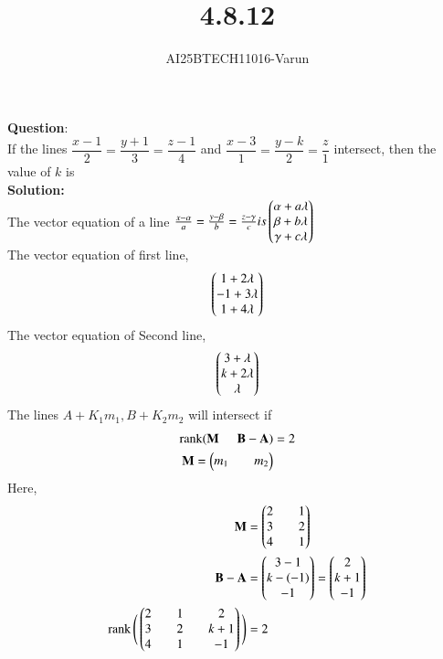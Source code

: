 \documentclass[journal]{IEEEtran}
\begin{document}

\vspace{3cm}

\title{4.8.12}
\author{AI25BTECH11016-Varun}
 \maketitle
{\let\newpage\relax\maketitle}
\renewcommand{\thefigure}{\theenumi}
\renewcommand{\thetable}{\theenumi}
\setlength{\intextsep}{10pt} %

\renewcommand{\thetable}{\theenumi}
\textbf{Question}:\\
If the lines $\dfrac{x-1}{2} = \dfrac{y+1}{3} = \dfrac{z-1}{4}$ 
and $\dfrac{x-3}{1} = \dfrac{y-k}{2} = \dfrac{z}{1}$ intersect, 
then the value of $k$ is\\
\textbf{Solution:}\\
The vector equation of a line $\tfrac{x-\alpha}{a}=\tfrac{y-\beta}{b}=\tfrac{z-\gamma}{c}  is \begin{pmatrix}\alpha+a\lambda\\\beta+b\lambda\\\gamma+c\lambda\end{pmatrix}$\\
The vector equation of first line,
\begin{align}
\begin{pmatrix}1+2\lambda\\-1+3\lambda\\1+4\lambda\end{pmatrix}
\end{align}
The vector equation of Second line,
\begin{align}
\begin{pmatrix}3+\lambda\\k+2\lambda\\\lambda\end{pmatrix}
\end{align}
The lines $A+ K_1m_1,B+K_2m_2$ will intersect if 
\begin{align}
\operatorname{rank}(\mathbf{M} \hspace{5mm}  \mathbf{B-A})&=2\\
\mathbf{M}=\begin{pmatrix}m_1&&m_2\end{pmatrix}
\end{align}
Here,
\begin{align}
\mathbf{M}&=\begin{pmatrix}2&&1\\3&&2\\4&&1\end{pmatrix}\\
\mathbf{B-A}&=\begin{pmatrix}3-1\\k-(-1)\\-1\end{pmatrix}=\begin{pmatrix}2\\k+1\\-1\end{pmatrix}\\
\operatorname{rank}\Bigg(\begin{pmatrix}2&&1&&2\\3&&2&&k+1\\4&&1&&-1\end{pmatrix}\Bigg)&=2
\end{align}
\end{document}
